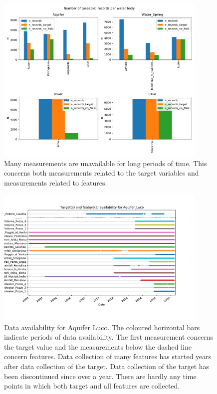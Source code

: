 \documentclass{article}
\begin{document}
\begin{figure}[p]
\begin{center}
\includegraphics[width=0.9\textwidth]{figs/Number_of_(useable)_records_per_water_body.pdf}
\caption{Many measurements are unavailable for long periods of time. This concerns both measurements related to the target variables and measurements related to features. }
\label{fig:prep_nan}
\end{center}
\end{figure}

\begin{figure}[htb]
\begin{center}
\includegraphics[width=0.9\textwidth]{figs/Aquifer_Luco.pdf}
\caption{Data availability for Aquifer Luco. The coloured horizontal bars indicate periods of data availability. The first measurement concerns the target value and the measurements below the dashed line concern features. Data collection of many features has started years after data collection of the target. Data collection of the target has been discontinued since over a year. There are hardly any time points in which both target and all features are collected.}
\label{fig:prep_missing_data}
\end{center}
\end{figure}
\end{document}
